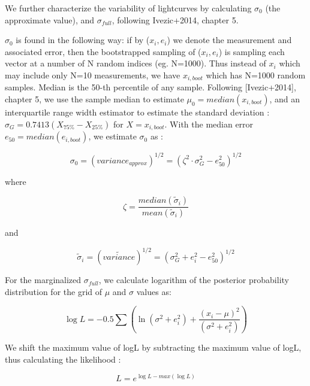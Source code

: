 \documentclass[fleqn,usenatbib]{mnras}  %
\begin{document}
We further characterize the variability of lightcurves by calculating $\sigma_{0}$ (the approximate value), and $\sigma_{full}$, following Ivezic+2014, chapter 5. 

$\sigma_{0}$ is found in the following way: if by ($x_{i}, e_{i}$) we denote the measurement and associated error, then the bootstrapped sampling of ($x_{i}, e_{i}$) is sampling each vector at a number of N random indices (eg. N=1000). Thus instead of $x_{i}$ which may include only N=10 measurements, we have $x_{i,boot}$ which has N=1000 random samples. Median is the 50-th percentile of any sample.  Following [Ivezic+2014], chapter 5, we use the sample median to estimate $\mu_{0} = median(x_{i,boot})$, and an interquartile range width estimator to estimate the standard deviation : $\sigma_{G} =0.7413 (X_{75\%} - X_{25\%}) $ for $X = x_{i,boot}$.
With the median error $e_{50} = median(e_{i,boot})$, we estimate $\sigma_{0}$ as : 

\begin{equation}
\sigma_{0} = ( variance_{approx} )^{1/2} = (\zeta^{2} \cdot \sigma_{G}^{2} - e_{50} ^ {2})^{1/2}
\end{equation}

where 

\begin{equation}
\zeta = \frac{median(\widetilde{\sigma}_{i})} {mean(\widetilde{\sigma}_{i})}
\end{equation}

and 

\begin{equation}
\widetilde{\sigma}_{i} =  ( \widetilde{variance} )^{1/2} = ( \sigma_{G}^{2} + e_{i}^{2} - e_{50}^{2} )^{1/2}
\end{equation}


For the marginalized $\sigma_{full}$, we calculate logarithm of the posterior probability distribution for the grid of $\mu$ and $\sigma$ values as:

\begin{equation}
\log{L} = -0.5 \sum \left( \ln(\sigma^{2}+e_{i}^{2}) + \frac{(x_{i}-\mu)^{2}}{(\sigma^{2}+e_{i}^{2})} \right)
\end{equation}

We shift the maximum value of logL by subtracting the maximum value of logL, thus calculating the likelihood : 

\begin{equation}
L = e^{\log{L} - max(\log{L})}
\end{equation}
\end{document}
